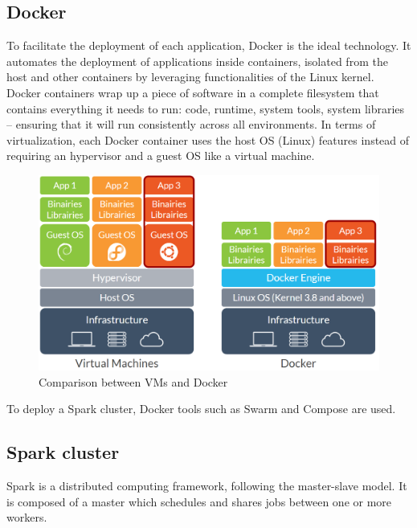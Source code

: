 \documentclass[11pt]{article}
\begin{document}
\subsection{Docker}

To facilitate the deployment of each application, Docker is the ideal technology. It automates the deployment of applications inside containers, isolated from the host and other containers by leveraging functionalities of the Linux kernel. Docker containers wrap up a piece of software in a complete filesystem that contains everything it needs to run: code, runtime, system tools, system libraries – ensuring that it will run consistently across all environments. In terms of virtualization, each Docker container uses the host OS (Linux) features instead of requiring an hypervisor and a guest OS like a virtual machine.

\begin{figure}[h!]
    \centering
    \includegraphics[scale=0.4]{img/docker-vs-vm.png}
    \caption{Comparison between VMs and Docker}
    \label{docker-vs-vm}
\end{figure}

To deploy a Spark cluster, Docker tools such as Swarm and Compose are used. %

\subsection{Spark cluster}


Spark is a distributed computing framework, following the master-slave model. It is composed of a master which schedules and shares jobs between one or more workers.
\end{document}
